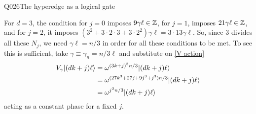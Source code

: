 \begin{entry}{Q026}{The hyperedge as a logical gate}
\begin{solution}[Part (b)]
For $d=3$, the condition for $j=0$ imposes $9\gamma\ell \in \mathbb{Z}$, for $j=1$, imposes $21 \gamma \ell \in \mathbb{Z}$, and for $j=2$, it imposes $(3^2 +3\cdot2\cdot3 + 3\cdot2^2)\gamma\ell=3\cdot13 \gamma \ell$. So, since $3$ divides all these $N_j$, we need $\gamma \ell = n/3$ in order for all these conditions to be met. To see this is sufficient, take $\gamma \equiv \gamma_n = n/3\ell$ and substitute on \eqref{V action} 
\begin{equation}
\begin{split}
    V_\gamma\lvert (dk+j)\ell \rangle &=   \omega^{  (3k +j)^3 n/3}  \lvert (dk+j)\ell \rangle\\
    &= \omega^{(27k^3+ 27j+ 9j^3 + j^3)n/3}  \lvert (dk+j)\ell \rangle\\
    &= \omega^{ j^3n/3}  \lvert (dk+j)\ell \rangle
\end{split}
\end{equation}
acting as a constant phase for a fixed $j$.


\end{solution}


\begin{takeaway}
\end{takeaway}


\end{entry}
